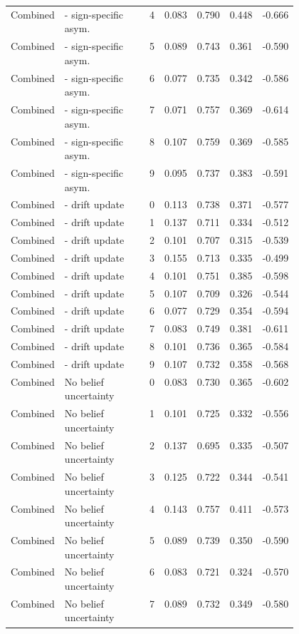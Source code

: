 \documentclass{article}
\begin{document}
\begin{center}
\begin{longtable}{p{0.13\linewidth}p{0.34\linewidth}rrrrr}
Combined & - sign-specific asym. & 4 & 0.083 & 0.790 & 0.448 & -0.666\\
Combined & - sign-specific asym. & 5 & 0.089 & 0.743 & 0.361 & -0.590\\
Combined & - sign-specific asym. & 6 & 0.077 & 0.735 & 0.342 & -0.586\\
Combined & - sign-specific asym. & 7 & 0.071 & 0.757 & 0.369 & -0.614\\
Combined & - sign-specific asym. & 8 & 0.107 & 0.759 & 0.369 & -0.585\\
Combined & - sign-specific asym. & 9 & 0.095 & 0.737 & 0.383 & -0.591\\
Combined & - drift update & 0 & 0.113 & 0.738 & 0.371 & -0.577\\
Combined & - drift update & 1 & 0.137 & 0.711 & 0.334 & -0.512\\
Combined & - drift update & 2 & 0.101 & 0.707 & 0.315 & -0.539\\
Combined & - drift update & 3 & 0.155 & 0.713 & 0.335 & -0.499\\
Combined & - drift update & 4 & 0.101 & 0.751 & 0.385 & -0.598\\
Combined & - drift update & 5 & 0.107 & 0.709 & 0.326 & -0.544\\
Combined & - drift update & 6 & 0.077 & 0.729 & 0.354 & -0.594\\
Combined & - drift update & 7 & 0.083 & 0.749 & 0.381 & -0.611\\
Combined & - drift update & 8 & 0.101 & 0.736 & 0.365 & -0.584\\
Combined & - drift update & 9 & 0.107 & 0.732 & 0.358 & -0.568\\
Combined & No belief uncertainty & 0 & 0.083 & 0.730 & 0.365 & -0.602\\
Combined & No belief uncertainty & 1 & 0.101 & 0.725 & 0.332 & -0.556\\
Combined & No belief uncertainty & 2 & 0.137 & 0.695 & 0.335 & -0.507\\
Combined & No belief uncertainty & 3 & 0.125 & 0.722 & 0.344 & -0.541\\
Combined & No belief uncertainty & 4 & 0.143 & 0.757 & 0.411 & -0.573\\
Combined & No belief uncertainty & 5 & 0.089 & 0.739 & 0.350 & -0.590\\
Combined & No belief uncertainty & 6 & 0.083 & 0.721 & 0.324 & -0.570\\
Combined & No belief uncertainty & 7 & 0.089 & 0.732 & 0.349 & -0.580\\

\end{longtable}
\end{center}
\end{document}
